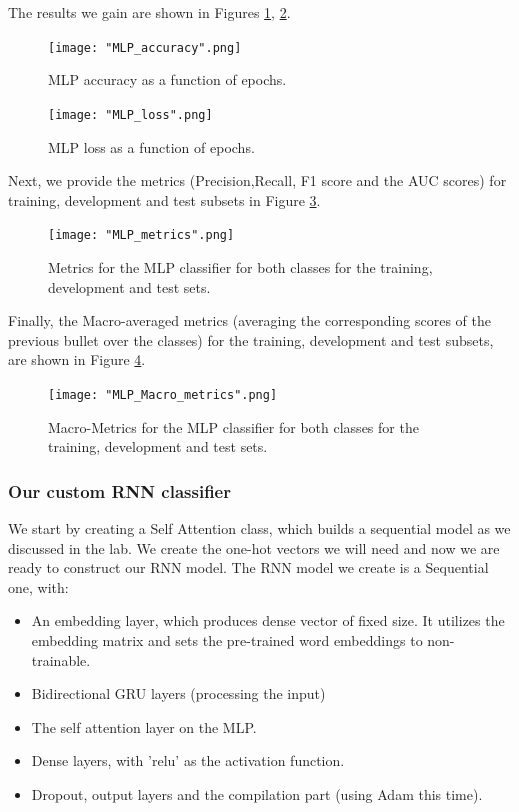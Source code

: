 \documentclass[10pt, a4paper]{article}
\begin{document}
	The results we gain are shown in Figures \ref{fig::mlp_accuracy}, \ref{fig::mlp_loss}.
	
	\begin{figure}
		\centering
		\texttt{[image: "MLP\_accuracy".png]}
		\caption{MLP accuracy as a function of epochs.}
		\label{fig::mlp_accuracy}
	\end{figure}
	
	\begin{figure}
		\centering
		\texttt{[image: "MLP\_loss".png]}
		\caption{MLP loss as a function of epochs.}
		\label{fig::mlp_loss}
	\end{figure}
	
	Next, we provide the metrics (Precision,Recall, F1 score and the AUC scores) for training, development and test subsets in Figure \ref{fig::mlp_metrics}.
	
	\begin{figure}
		\centering
		\texttt{[image: "MLP\_metrics".png]}
		\caption{Metrics for the MLP classifier for both classes for the training, development and test sets.}
		\label{fig::mlp_metrics}
	\end{figure}
	
	Finally,  the Macro-averaged metrics (averaging the corresponding scores of the previous bullet over the classes) for the training, development and test subsets, are shown in Figure \ref{fig::mlp_macro_metrics}.
	
	\begin{figure}
		\centering
		\texttt{[image: "MLP\_Macro\_metrics".png]}
		\caption{Macro-Metrics for the MLP classifier for both classes for the training, development and test sets.}
		\label{fig::mlp_macro_metrics}
	\end{figure}
	
	\subsubsection{Our custom RNN classifier}
	We start by creating a Self Attention class, which builds a sequential model as we discussed in the lab. We create the one-hot vectors we will need and now we are ready to construct our RNN model. The RNN model we create is a Sequential one, with:
	\begin{itemize}
		\item An embedding layer, which produces dense vector of fixed size. It utilizes the embedding matrix and sets the pre-trained word embeddings to non-trainable.
		\item Bidirectional GRU layers (processing the input)
		\item The self attention layer on the MLP.
		\item Dense layers, with 'relu' as the activation function.
		\item Dropout, output layers and the compilation part (using Adam this time).
	\end{itemize}
	
\end{document}
